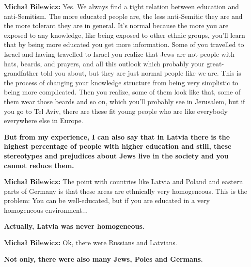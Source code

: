 \textbf{Michał Bilewicz:} Yes. We always find a tight relation between education and anti-Semitism. The more educated people are, the less anti-Semitic they are and the more tolerant they are in general. It’s normal because the more you are exposed to any knowledge, like being exposed to other ethnic groups, you'll learn that by being more educated you get more information. Some of you travelled to Israel and having travelled to Israel you realize that Jews are not people with hats, beards, and prayers, and all this outlook which probably your great-grandfather told you about, but they are just normal people like we are. This is the process of changing your knowledge structure from being very simplistic to being more complicated. Then you realize, some of them look like that, some of them wear those beards and so on, which you'll probably see in Jerusalem, but if you go to Tel Aviv, there are these fit young people who are like everybody everywhere else in Europe. 

\textbf{But from my experience, I can also say that in Latvia there is the highest percentage of people with higher education and still, these stereotypes and prejudices about Jews live in the society and you cannot reduce them.} 

\textbf{Michał Bilewicz:} The point with countries like Latvia and Poland and eastern parts of Germany is that these areas are ethnically very homogeneous. This is the problem: You can be well-educated, but if you are educated in a very homogeneous environment...

\textbf{Actually, Latvia was never homogeneous.}

\textbf{Michał Bilewicz:} Ok, there were Russians and Latvians.

\textbf{Not only, there were also many Jews, Poles and Germans.}

